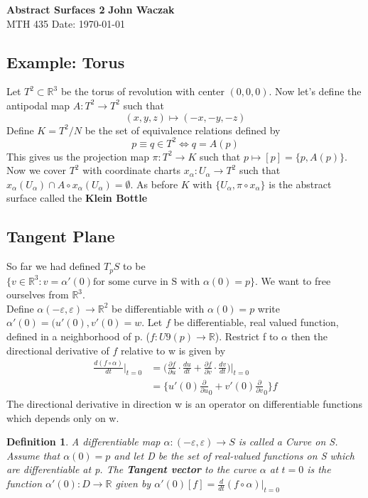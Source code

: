 \documentclass[a4paper, 11pt]{article}
\newtheorem*{definition}{Definition}
\begin{document}
\noindent
\large\textbf{Abstract Surfaces 2} \hfill \textbf{John Waczak} \\
\normalsize MTH 435 \hfill  Date: \today \\


\subsection*{Example: Torus} 
	Let $T^2\subset\mathbb{R}^3$ be the torus of revolution with center $(0,0,0)$. Now let's define the antipodal map $A:T^2\to T^2$ such that 
		\begin{equation*}
			(x,y,z)\mapsto (-x,-y,-z)
		\end{equation*}
	Define $K = T^2/N$ be the set of equivalence relations defined by 
		\begin{equation*}
			p\equiv q \in T^2 \iff q = A(p) 
		\end{equation*}
	This gives us the projection map $\pi: T^2 \to K$ such that $p\mapsto [p] = \{p, A(p)\}$. Now we cover $T^2$ with coordinate charts $x_\alpha:U_\alpha\to T^2$ such that $x_\alpha(U_\alpha) \cap A\circ x_\alpha(U_\alpha) = \emptyset$. As before $K$ with $\{U_\alpha, \pi\circ x_\alpha\}$ is the abstract surface called the \textbf{Klein Bottle} 
	
\subsection*{Tangent Plane} 
	So far we had defined $T_pS $ to be $\{v \in \mathbb{R}^3: v=\alpha'(0) \text {for some curve in S with } \alpha(0) = p\}$. We want to free ourselves from $\mathbb{R}^3$. \\ 
	
	\noindent Define $\alpha(-\varepsilon,\varepsilon)\to\mathbb{R}^2$ be differentiable with $\alpha(0) =p$ write $\alpha'(0)=(u'(0), v'(0) = w$. Let $f$ be differentiable, real valued function, defined in a neighborhood of p. ($f:U9(p)\to \mathbb{R}$). Restrict f to $\alpha$ then the directional derivative of $f$ relative to w is given by 
		\begin{align*}
			\frac{d(f\circ \alpha)}{dt}\Big|_{t=0} &= \Big(\frac{\partial f}{\partial u}\cdot \frac{du}{dt}+\frac{\partial f}{\partial v}\cdot \frac{dv}{dt}\Big)\Big|_{t=0} \\ 
			&= \Big\{ u'(0)\frac{\partial}{\partial u}_0 + v'(0)\frac{\partial}{\partial v}_0 \Big\}f
		\end{align*}
	\noindent The directional derivative in direction w is an operator on differentiable functions which depends only on w. 
	
	\begin{definition}
		A differentiable map $\alpha:(-\varepsilon, \varepsilon)\to S$ is called a \textit{Curve on S}. Assume that $\alpha(0) = p$ and let D be the set of real-valued functions on S which are differentiable at p. The \textbf{Tangent vector} to the curve $\alpha$ at $t=0$ is the function $\alpha'(0):D\to\mathbb{R}$ given by $\alpha'(0)[f] = \frac{d}{dt}(f\circ\alpha)\Big|_{t=0}$ 
	\end{definition}
\end{document}
